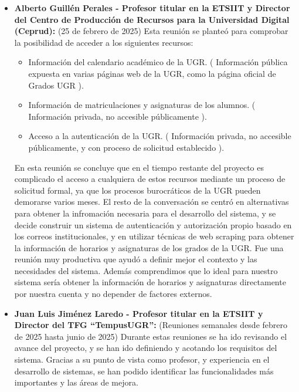 \begin{itemize}
\begin{itemize}
        \item \textbf{Alberto Guillén Perales - Profesor titular en la ETSIIT y Director del Centro de Producción de Recursos para la Universidad Digital (Ceprud):} (25 de febrero de 2025) Esta reunión se planteó para comprobar la posibilidad de acceder a los siguientes recursos:
        \begin{itemize}
            \item Información del calendario académico de la UGR. ( Información pública expuesta en varias páginas web de la UGR, como la página oficial de Grados UGR ).
            \item Información de matriculaciones y asignaturas de los alumnos. ( Información privada, no accesible públicamente ).
            \item Acceso a la autenticación de la UGR. ( Información privada, no accesible públicamente, y con proceso de solicitud establecido ).
        \end{itemize}
        En esta reunión se concluye que en el tiempo restante del proyecto es complicado el acceso a cualquiera de estos recursos mediante un proceso de solicitud formal, ya que los procesos burocráticos de la UGR pueden demorarse varios meses. \newline
        El resto de la conversación se centró en alternativas para obtener la infromación necesaria para el desarrollo del sistema, y se decide construir un sistema de autenticación y autorización propio basado en los correos institucionales, y en utilizar técnicas de web scraping para obtener la información de horarios y asignaturas de los grados de la UGR. \newline
        Fue una reunión muy productiva que ayudó a definir mejor el contexto y las necesidades del sistema. Además comprendimos que lo ideal para nuestro sistema sería obtener la información de horarios y asignaturas directamente por nuestra cuenta y no depender de factores externos. \newline
        \item \textbf{Juan Luis Jiménez Laredo - Profesor titular en la ETSIIT y Director del TFG ``TempusUGR'':} (Reuniones semanales desde febrero de 2025 hasta junio de 2025) Durante estas reuniones se ha ido revisando el avance del proyecto, y se han ido definiendo y acotando los requisitos del sistema. \newline
        Gracias a su punto de vista como profesor, y experiencia en el desarrollo de sistemas, se han podido identificar las funcionalidades más importantes y las áreas de mejora. \newline

    \end{itemize}
\end{itemize}

